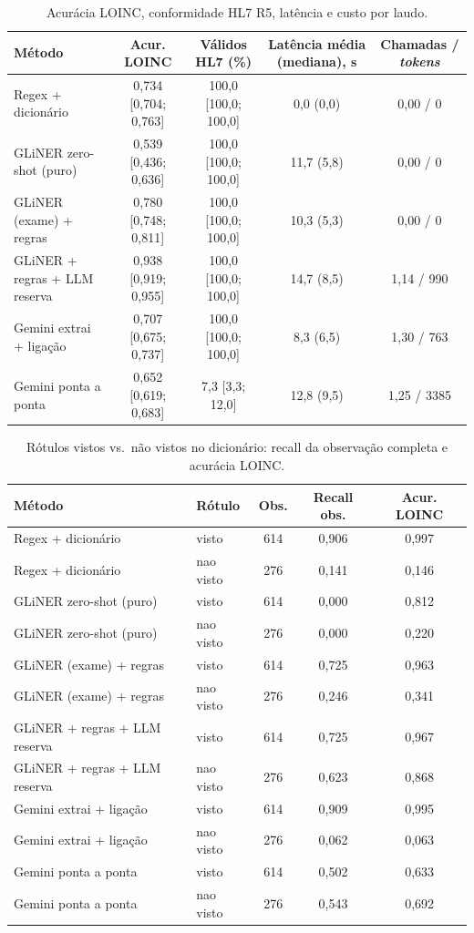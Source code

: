 \begin{table}[ht]\centering\small
\caption{Acurácia LOINC, conformidade HL7 R5, latência e custo por laudo.}\label{tab:fhir}
\begin{tabular}{lcccc}\toprule
Método & Acur. LOINC & Válidos HL7 (\%) & Latência média (mediana), s & Chamadas / \textit{tokens}\\\midrule
Regex + dicionário & 0,734 [0,704; 0,763] & 100,0 [100,0; 100,0] & 0,0 (0,0) & 0,00 / 0\\
GLiNER zero-shot (puro) & 0,539 [0,436; 0,636] & 100,0 [100,0; 100,0] & 11,7 (5,8) & 0,00 / 0\\
GLiNER (exame) + regras & 0,780 [0,748; 0,811] & 100,0 [100,0; 100,0] & 10,3 (5,3) & 0,00 / 0\\
GLiNER + regras + LLM reserva & 0,938 [0,919; 0,955] & 100,0 [100,0; 100,0] & 14,7 (8,5) & 1,14 / 990\\
Gemini extrai + ligação & 0,707 [0,675; 0,737] & 100,0 [100,0; 100,0] & 8,3 (6,5) & 1,30 / 763\\
Gemini ponta a ponta & 0,652 [0,619; 0,683] & 7,3 [3,3; 12,0] & 12,8 (9,5) & 1,25 / 3385\\
\bottomrule\end{tabular}\end{table}

\begin{table}[ht]\centering\small
\caption{Rótulos vistos vs.\ não vistos no dicionário: recall da observação completa e acurácia LOINC.}\label{tab:vistos}
\begin{tabular}{llccc}\toprule
Método & Rótulo & Obs. & Recall obs. & Acur. LOINC\\\midrule
Regex + dicionário & visto & 614 & 0,906 & 0,997\\
Regex + dicionário & nao visto & 276 & 0,141 & 0,146\\
GLiNER zero-shot (puro) & visto & 614 & 0,000 & 0,812\\
GLiNER zero-shot (puro) & nao visto & 276 & 0,000 & 0,220\\
GLiNER (exame) + regras & visto & 614 & 0,725 & 0,963\\
GLiNER (exame) + regras & nao visto & 276 & 0,246 & 0,341\\
GLiNER + regras + LLM reserva & visto & 614 & 0,725 & 0,967\\
GLiNER + regras + LLM reserva & nao visto & 276 & 0,623 & 0,868\\
Gemini extrai + ligação & visto & 614 & 0,909 & 0,995\\
Gemini extrai + ligação & nao visto & 276 & 0,062 & 0,063\\
Gemini ponta a ponta & visto & 614 & 0,502 & 0,633\\
Gemini ponta a ponta & nao visto & 276 & 0,543 & 0,692\\
\bottomrule\end{tabular}\end{table}

